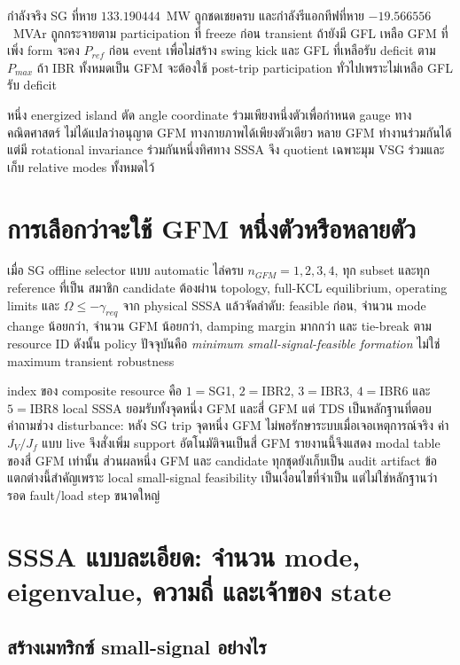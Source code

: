 \documentclass[12pt,a4paper]{article}
\begin{document}
กำลังจริง SG ที่หาย $133.190444$~MW ถูกชดเชยครบ และกำลังรีแอกทีฟที่หาย
$-19.566556$~MVAr ถูกกระจายตาม participation ที่ freeze ก่อน transient ถ้ายังมี GFL เหลือ GFM ที่เพิ่ง
form จะคง $P_{ref}$ ก่อน event เพื่อไม่สร้าง swing kick และ GFL ที่เหลือรับ deficit ตาม $P_{max}$
ถ้า IBR ทั้งหมดเป็น GFM จะต้องใช้ post-trip participation ทั่วไปเพราะไม่เหลือ GFL รับ deficit

หนึ่ง energized island ตัด angle coordinate ร่วมเพียงหนึ่งตัวเพื่อกำหนด gauge ทางคณิตศาสตร์
ไม่ได้แปลว่าอนุญาต GFM ทางกายภาพได้เพียงตัวเดียว หลาย GFM ทำงานร่วมกันได้ แต่มี rotational invariance
ร่วมกันหนึ่งทิศทาง SSSA จึง quotient เฉพาะมุม VSG ร่วมและเก็บ relative modes ทั้งหมดไว้

\section{การเลือกว่าจะใช้ GFM หนึ่งตัวหรือหลายตัว}

เมื่อ SG offline selector แบบ automatic ไล่ครบ $n_{GFM}=1,2,3,4$, ทุก subset และทุก reference ที่เป็น
สมาชิก candidate ต้องผ่าน topology, full-KCL equilibrium, operating limits และ
$\Omega\le-\gamma_{req}$ จาก physical SSSA แล้วจัดลำดับ: feasible ก่อน, จำนวน mode change น้อยกว่า,
จำนวน GFM น้อยกว่า, damping margin มากกว่า และ tie-break ตาม resource ID ดังนั้น policy ปัจจุบันคือ
\emph{minimum small-signal-feasible formation} ไม่ใช่ maximum transient robustness

index ของ composite resource คือ $1=$SG1, $2=$IBR2, $3=$IBR3, $4=$IBR6 และ $5=$IBR8
local SSSA ยอมรับทั้งจุดหนึ่ง GFM และสี่ GFM แต่ TDS เป็นหลักฐานที่ตอบคำถามช่วง disturbance:
หลัง SG trip จุดหนึ่ง GFM ไม่พอรักษาระบบเมื่อเจอเหตุการณ์จริง ค่า $J_V/J_f$ แบบ live จึงสั่งเพิ่ม support
อัตโนมัติจนเป็นสี่ GFM รายงานนี้จึงแสดง modal table ของสี่ GFM เท่านั้น ส่วนผลหนึ่ง GFM และ candidate
ทุกชุดยังเก็บเป็น audit artifact ข้อแตกต่างนี้สำคัญเพราะ local small-signal feasibility เป็นเงื่อนไขที่จำเป็น
แต่ไม่ใช่หลักฐานว่ารอด fault/load step ขนาดใหญ่

\section{SSSA แบบละเอียด: จำนวน mode, eigenvalue, ความถี่ และเจ้าของ state}

\subsection{สร้างเมทริกซ์ small-signal อย่างไร}
\end{document}
